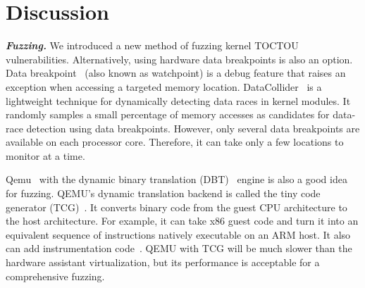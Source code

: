 
\section{Discussion}
\label{sec:discussion}

\textbf{\textit{Fuzzing.}} We introduced a new method of fuzzing kernel TOCTOU vulnerabilities. Alternatively, using hardware data breakpoints is also an option. Data breakpoint~\cite{krishnan2009hardware} (also known as watchpoint) is a debug feature that raises an exception when accessing a targeted memory location.  DataCollider~\cite{krishnan2009hardware} is a lightweight technique for dynamically detecting data races in kernel modules. It randomly samples a small percentage of memory accesses as candidates for data-race detection using data breakpoints. However, only several data breakpoints are available on each processor core. Therefore, it can take only a few locations to monitor at a time.


Qemu~\cite{bellard2005qemu} with the dynamic binary translation (DBT)~\cite{ebcioglu2001dynamic} engine is also a good idea for fuzzing. QEMU's dynamic translation backend is called the tiny code generator (TCG)~\cite{bellard2005qemu}.  It converts binary code from the guest CPU architecture to the host architecture. For example, it can take x86 guest code and turn it into an equivalent sequence of instructions natively executable on an ARM host. It also can add instrumentation code~\cite{quynh2015unicorn}. QEMU with TCG will be much slower than the hardware assistant virtualization, but its performance is acceptable for a comprehensive fuzzing.




